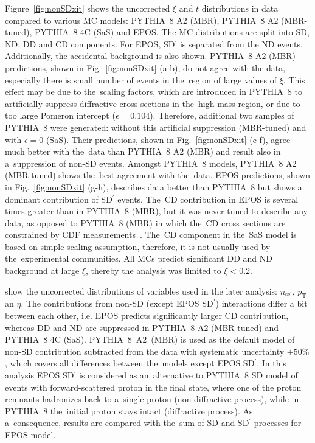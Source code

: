 Figure~\ref{fig:nonSDxit} shows the uncorrected $\xi$ and $t$ distributions in data compared to various \ac{MC} models: PYTHIA~8 A2 (MBR), PYTHIA~8 A2 (MBR-tuned), PYTHIA~8 4C (SaS) and EPOS. The \ac{MC} distributions are split into \ac{SD}, \ac{ND}, \ac{DD} and \ac{CD} components. For EPOS, SD$^\prime$ is separated from the ND events. Additionally, the accidental background is also shown. PYTHIA~8 A2 (MBR) predictions, shown in Fig.~\ref{fig:nonSDxit} (a-b), do not agree with the data, especially  there is small number of events in the~region of large values of $\xi$. 
This effect may be due to the~scaling factors, which are introduced in PYTHIA~8 to artificially suppress diffractive cross sections in the~high mass region, or due to too large Pomeron intercept ($\epsilon=0.104$).
 Therefore,
additional two samples of PYTHIA~8 were generated: without this artificial suppression  (\mbox{MBR-tuned}) and with  $\epsilon=0$ (\mbox{SaS}). Their predictions, shown in Fig.~\ref{fig:nonSDxit} (c-f), agree much better with the~data than PYTHIA~8 A2 (MBR) and result also in a~suppression of non-SD events. Amongst PYTHIA~8 models, PYTHIA~8 A2 (MBR-tuned) shows the~best agreement  with the~data.
EPOS predictions,  shown in Fig.~\ref{fig:nonSDxit} (g-h), describes data better than PYTHIA~8 but shows a dominant contribution of SD$^\prime$ events. The~CD contribution in EPOS is several times greater than in PYTHIA~8 (MBR), but it was never tuned to describe any data, as opposed to PYTHIA~8 (MBR) in which the~\ac{CD} cross sections are constrained by CDF measurements~\cite{Acosta:2003xi}. 
The~\ac{CD} component in the~\ac{SaS} model is based on simple scaling assumption, therefore, it is not usually used by the~experimental communities. All MCs predict significant \ac{DD} and \ac{ND} background at large $\xi$, thereby  the analysis was limited to $\xi < 0.2$. 


 show the uncorrected distributions of variables used in the later analysis: $n_{\mathrm{sel}}$, $p_{\mathrm T}$ an $\bar{\eta}$. The  contributions from non-SD (except  EPOS SD$^\prime$) interactions differ a bit between each other, i.e. EPOS predicts significantly larger CD contribution, whereas DD and ND are suppressed in PYTHIA~8 A2 (MBR-tuned) and PYTHIA~8 4C (SaS).  PYTHIA~8~A2~(MBR) is used as the default model  of non-SD contribution subtracted from the data with systematic uncertainty $\pm50\%$, which covers all differences between the~models except EPOS SD$^\prime$.  In this analysis EPOS SD$^\prime$ is   considered as an~alternative to PYTHIA~8 SD model of events with forward-scattered proton in the final state,  where one of the proton remnants hadronizes back to a~single proton (non-diffractive process), while in  PYTHIA~8 the~initial proton stays intact (diffractive process). As a~consequence, results  are compared  with the~sum of SD and SD$^\prime$ processes for EPOS model.  


